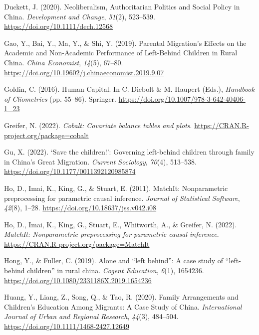 \documentclass[
  man,floatsintext]{apa7}
\newlength{\cslhangindent}
\newlength{\cslentryspacingunit} %
\newenvironment{CSLReferences}[2] %
 {%
  \setlength{\parindent}{0pt}
  \ifodd #1
  \let\oldpar\par
  \def\par{\hangindent=\cslhangindent\oldpar}
  \fi
  \setlength{\parskip}{#2\cslentryspacingunit}
 }%
 {}
\begin{document}
\begin{CSLReferences}{1}{0}
\leavevmode{}%
Duckett, J. (2020). Neoliberalism, Authoritarian Politics and Social Policy in China. \emph{Development and Change}, \emph{51}(2), 523--539. \url{https://doi.org/10.1111/dech.12568}

\leavevmode{}%
Gao, Y., Bai, Y., Ma, Y., \& Shi, Y. (2019). Parental Migration{'}s Effects on the Academic and Non-Academic Performance of Left-Behind Children in Rural China. \emph{China Economist}, \emph{14}(5), 67--80. \url{https://doi.org/10.19602/j.chinaeconomist.2019.9.07}

\leavevmode{}%
Goldin, C. (2016). Human Capital. In C. Diebolt \& M. Haupert (Eds.), \emph{Handbook of Cliometrics} (pp. 55--86). Springer. \url{https://doi.org/10.1007/978-3-642-40406-1_23}

\leavevmode{}%
Greifer, N. (2022). \emph{Cobalt: Covariate balance tables and plots}. \url{https://CRAN.R-project.org/package=cobalt}

\leavevmode{}%
Gu, X. (2022). {`}Save the children!{'}: Governing left-behind children through family in China{'}s Great Migration. \emph{Current Sociology}, \emph{70}(4), 513--538. \url{https://doi.org/10.1177/0011392120985874}

\leavevmode{}%
Ho, D., Imai, K., King, G., \& Stuart, E. (2011). {MatchIt}: Nonparametric preprocessing for parametric causal inference. \emph{Journal of Statistical Software}, \emph{42}(8), 1--28. \url{https://doi.org/10.18637/jss.v042.i08}

\leavevmode{}%
Ho, D., Imai, K., King, G., Stuart, E., Whitworth, A., \& Greifer, N. (2022). \emph{MatchIt: Nonparametric preprocessing for parametric causal inference}. \url{https://CRAN.R-project.org/package=MatchIt}

\leavevmode{}%
Hong, Y., \& Fuller, C. (2019). Alone and {``}left behind{''}: A case study of {``}left-behind children{''} in rural china. \emph{Cogent Education}, \emph{6}(1), 1654236. \url{https://doi.org/10.1080/2331186X.2019.1654236}

\leavevmode{}%
Huang, Y., Liang, Z., Song, Q., \& Tao, R. (2020). Family Arrangements and Children's Education Among Migrants: A Case Study of China. \emph{International Journal of Urban and Regional Research}, \emph{44}(3), 484--504. \url{https://doi.org/10.1111/1468-2427.12649}


\end{CSLReferences}
\end{document}
